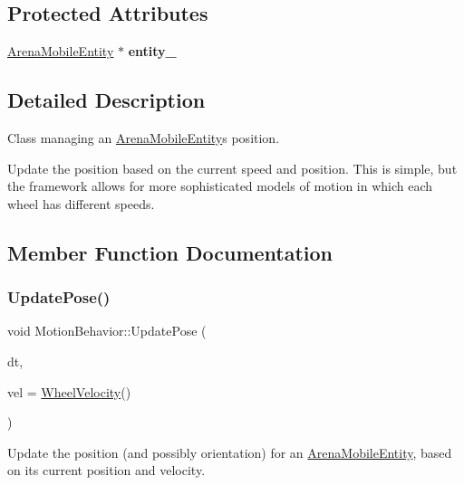 \subsection*{Protected Attributes}
\begin{DoxyCompactItemize}
\item 
\mbox{\label{class_motion_behavior_a9254cf197657a2a52d89dbc01da31b8f}} 
\mbox{\hyperlink{class_arena_mobile_entity}{Arena\+Mobile\+Entity}} $\ast$ {\bfseries entity\+\_\+}
\end{DoxyCompactItemize}


\subsection{Detailed Description}
Class managing an \mbox{\hyperlink{class_arena_mobile_entity}{Arena\+Mobile\+Entity}}\textquotesingle{}s position. 

Update the position based on the current speed and position. This is simple, but the framework allows for more sophisticated models of motion in which each wheel has different speeds. 

\subsection{Member Function Documentation}
\mbox{\label{class_motion_behavior_a804f440bb7f03f19abec79a1ab671494}} 
\subsubsection{\texorpdfstring{Update\+Pose()}{UpdatePose()}}
{\footnotesize\ttfamily void Motion\+Behavior\+::\+Update\+Pose (\begin{DoxyParamCaption}\item[{double}]{dt,  }\item[{\mbox{\hyperlink{struct_wheel_velocity}{Wheel\+Velocity}}}]{vel = {\ttfamily \mbox{\hyperlink{struct_wheel_velocity}{Wheel\+Velocity}}()} }\end{DoxyParamCaption})\hspace{0.3cm}{\ttfamily [virtual]}}



Update the position (and possibly orientation) for an \mbox{\hyperlink{class_arena_mobile_entity}{Arena\+Mobile\+Entity}}, based on its current position and velocity. 


